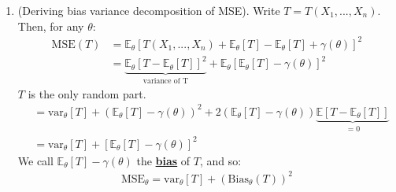 \documentclass[11pt]{scrartcl}
\theoremstyle{definition}
\theoremstyle{remark}
\newcommand{\dfn}[1]{\textbf{\underline{#1}}}
\newcommand{\stat}[0]{T(X_1, ..., X_n )}
\newcommand{\EX}[1]{\mathbb{E}\left[#1 \right]}
\newcommand{\EXth}[1]{\mathbb{E}_\theta \left[ #1 \right]}
\begin{document}
{\begin{enumerate}[noitemsep]
\begin{enumerate}[noitemsep]
		\begin{align*} 
		 \stat = \begin{cases}
				X_1 & \text{ if } n \leq 10^6 \\
				\overline{X} & \text{ if } n > 10^k
			\end{cases}	
		\end{align*}
	\item (Deriving bias variance decomposition of MSE). Write $T = \stat$. Then, for any $\theta$: 
		\begin{align*}
				\text{MSE}(T) &  = \EXth{\stat + \EXth{T} - \EXth{T} + \gamma(\theta) }^2 \\
					& = \underbrace{\EXth{T - \EXth{T} }^2}_{\text{variance of T}} + \EXth{ \EXth{T} - \gamma(\theta) }^2 
		\end{align*}
		$T$ is the only random part. 
		\begin{align*}
			& = \text{var}_\theta[T] + (\EXth{T}- \gamma(\theta))^2 + 2(\EXth{T} - \gamma(\theta))\underbrace{\EX{T - \EXth{T}}}_{=0} \\
			& = \text{var}_\theta[T] + [\EXth{T} - \gamma(\theta)]^2 
		\end{align*}
		We call $\EXth{T}-\gamma(\theta)$ the \dfn{bias} of $T$, and so: 
		\begin{align}
			\text{MSE}_\theta = \text{var}_\theta[T] + (\text{Bias}_\theta(T))^2 
		\end{align}
	\end{enumerate}
\end{enumerate}

}
\end{document}
